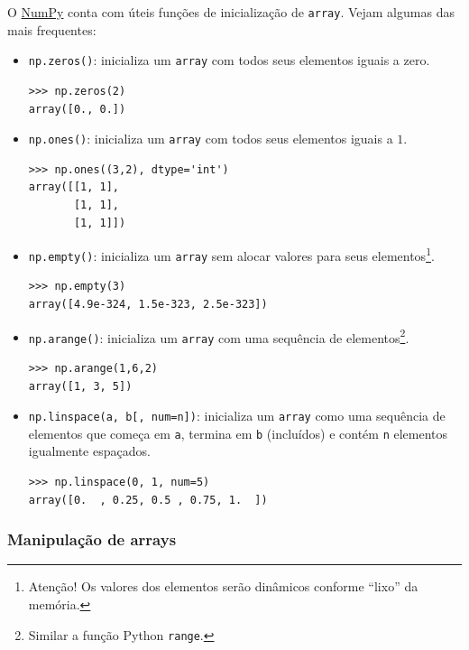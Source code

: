 \documentclass[12pt]{article}
\begin{document}
O \href{https://numpy.org/}{NumPy} conta com úteis funções de inicialização de \lstinline+array+. Vejam algumas das mais frequentes:
\begin{itemize}
\item \lstinline+np.zeros()+: inicializa um \lstinline+array+ com todos seus elementos iguais a zero.
  
\begin{lstlisting}
>>> np.zeros(2)
array([0., 0.])
\end{lstlisting}

  \item \lstinline+np.ones()+: inicializa um \lstinline+array+ com todos seus elementos iguais a $1$.

\begin{lstlisting}
>>> np.ones((3,2), dtype='int')
array([[1, 1],
       [1, 1],
       [1, 1]])
\end{lstlisting}

  \item \lstinline+np.empty()+: inicializa um \lstinline+array+ sem alocar valores para seus elementos\footnote{Atenção! Os valores dos elementos serão dinâmicos conforme ``lixo'' da memória.}.
  
\begin{lstlisting}
>>> np.empty(3)
array([4.9e-324, 1.5e-323, 2.5e-323])
\end{lstlisting}

  \item \lstinline+np.arange()+: inicializa um \lstinline+array+ com uma sequência de elementos\footnote{Similar a função Python \lstinline+range+.}.

\begin{lstlisting}
>>> np.arange(1,6,2)
array([1, 3, 5])
\end{lstlisting}

  \item \lstinline+np.linspace(a, b[, num=n])+: inicializa um \lstinline+array+ como uma sequência de elementos que começa em \lstinline+a+, termina em \lstinline+b+ (incluídos) e contém \lstinline+n+ elementos igualmente espaçados.

\begin{lstlisting}
>>> np.linspace(0, 1, num=5)
array([0.  , 0.25, 0.5 , 0.75, 1.  ])
\end{lstlisting}

\end{itemize}

\subsubsection{Manipulação de arrays}
\end{document}
